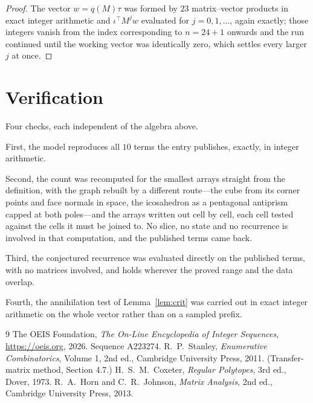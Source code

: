 \documentclass[11pt,a4paper]{article}
\theoremstyle{plain}
\theoremstyle{definition}
\begin{document}
\begin{proof}
The vector $w=q(M)\tau$ was formed by $23$ matrix--vector products in exact integer
arithmetic and $\iota^{\!\top}M^{j}w$ evaluated for $j=0,1,\dots$, again exactly; those
integers vanish from the index corresponding to $n=24+1$ onwards and the run continued
until the working vector was identically zero, which settles every larger $j$ at once.
\end{proof}

\section{Verification}

Four checks, each independent of the algebra above.

First, the model reproduces all $10$ terms the entry publishes, exactly, in integer
arithmetic.

Second, the count was recomputed for the smallest arrays straight from the definition, with the
graph rebuilt by a different route---the cube from its corner points and face normals in space,
the icosahedron as a pentagonal antiprism capped at both poles---and the arrays written out cell
by cell, each cell tested against the cells it must be joined to. No slice, no state and no
recurrence is involved in that computation, and the published terms came back.

Third, the conjectured recurrence was evaluated directly on the published terms, with no
matrices involved, and holds wherever the proved range and the data overlap.

Fourth, the annihilation test of Lemma~\ref{lem:crit} was carried out in exact integer
arithmetic on the whole vector rather than on a sampled prefix.

\begin{thebibliography}{9}
 The OEIS Foundation, \emph{The On-Line Encyclopedia of Integer
Sequences}, \url{https://oeis.org}, 2026. Sequence A223274.
 R.~P.~Stanley, \emph{Enumerative Combinatorics}, Volume 1, 2nd ed.,
Cambridge University Press, 2011. (Transfer-matrix method, Section 4.7.)
 H.~S.~M.~Coxeter, \emph{Regular Polytopes}, 3rd ed., Dover, 1973.
 R.~A.~Horn and C.~R.~Johnson, \emph{Matrix Analysis}, 2nd ed., Cambridge
University Press, 2013.
\end{thebibliography}
\end{document}
